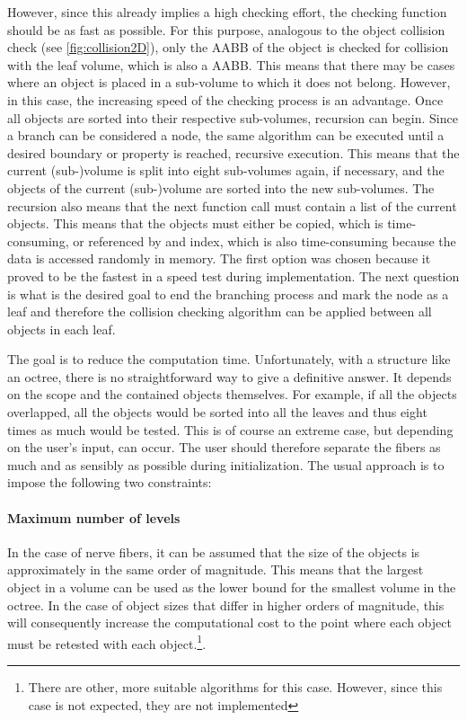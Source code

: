 However, since this already implies a high checking effort, the checking function should be as fast as possible.
For this purpose, analogous to the object collision check (see \cref{fig:collision2D}), only the \ac{AABB} of the object is checked for collision with the leaf volume, which is also a \ac{AABB}.
This means that there may be cases where an object is placed in a sub-volume to which it does not belong.
However, in this case, the increasing speed of the checking process is an advantage.
Once all objects are sorted into their respective sub-volumes, recursion can begin.
Since a branch can be considered a node, the same algorithm can be executed until a desired boundary or property is reached, \ie{} recursive execution.
This means that the current (sub-)volume is split into eight sub-volumes again, if necessary, and the objects of the current (sub-)volume are sorted into the new sub-volumes.
The recursion also means that the next function call must contain a list of the current objects.
This means that the objects must either be copied, which is time-consuming, or referenced by \eg{} and index, which is also time-consuming because the data is accessed randomly in memory.
The first option was chosen because it proved to be the fastest in a speed test during implementation.
The next question is what is the desired goal to end the branching process and mark the node as a leaf and therefore the collision checking algorithm can be applied between all objects in each leaf.
\par
%
The goal is to reduce the computation time.
Unfortunately, with a structure like an octree, there is no straightforward way to give a definitive answer.
It depends on the scope and the contained objects themselves.
For example, if all the objects overlapped, all the objects would be sorted into all the leaves and thus eight times as much would be tested.
This is of course an extreme case, but depending on the user's input, can occur.
The user should therefore separate the fibers as much and as sensibly as possible during initialization.
The usual approach is to impose the following two constraints:
%
\paragraph{Maximum number of levels}
In the case of nerve fibers, it can be assumed that the size of the objects is approximately in the same order of magnitude.
This means that the largest object in a volume can be used as the lower bound for the smallest volume in the octree.
In the case of object sizes that differ in higher orders of magnitude, this will consequently increase the computational cost to the point where each object must be retested with each object.\footnote{There are other, more suitable algorithms for this case. However, since this case is not expected, they are not implemented}.
%
